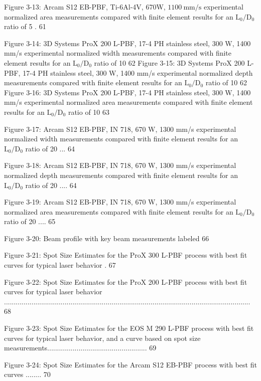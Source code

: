 \documentclass[10pt]{article}
\begin{document}
Figure 3-13: Arcam S12 EB-PBF, Ti-6Al-4V, 670W, $1100 \mathrm{~mm} / \mathrm{s}$ experimental normalized area measurements compared with finite element results for an $\mathrm{L}_{0} / \mathrm{D}_{0}$ ratio of 5 . 61

Figure 3-14: 3D Systems ProX 200 L-PBF, 17-4 PH stainless steel, 300 W, 1400 mm/s experimental normalized width measurements compared with finite element results for an $\mathrm{L}_{0} / \mathrm{D}_{0}$ ratio of 10 62 Figure 3-15: 3D Systems ProX 200 L-PBF, 17-4 PH stainless steel, 300 W, 1400 mm/s experimental normalized depth measurements compared with finite element results for an $\mathrm{L}_{0} / \mathrm{D}_{0}$ ratio of 10 62 Figure 3-16: 3D Systems ProX 200 L-PBF, 17-4 PH stainless steel, 300 W, 1400 mm/s experimental normalized area measurements compared with finite element results for an $\mathrm{L}_{0} / \mathrm{D}_{0}$ ratio of 10 63

Figure 3-17: Arcam S12 EB-PBF, IN 718, 670 W, 1300 mm/s experimental normalized width measurements compared with finite element results for an $\mathrm{L}_{0} / \mathrm{D}_{0}$ ratio of 20 ... 64

Figure 3-18: Arcam S12 EB-PBF, IN 718, 670 W, 1300 mm/s experimental normalized depth measurements compared with finite element results for an $\mathrm{L}_{0} / \mathrm{D}_{0}$ ratio of 20 .... 64

Figure 3-19: Arcam S12 EB-PBF, IN 718, 670 W, 1300 mm/s experimental normalized area measurements compared with finite element results for an $\mathrm{L}_{0} / \mathrm{D}_{0}$ ratio of 20 .... 65

Figure 3-20: Beam profile with key beam measurements labeled 66

Figure 3-21: Spot Size Estimates for the ProX 300 L-PBF process with best fit curves for typical laser behavior . 67

Figure 3-22: Spot Size Estimates for the ProX 200 L-PBF process with best fit curves for typical laser behavior .............................................................................................................................. 68

Figure 3-23: Spot Size Estimates for the EOS M 290 L-PBF process with best fit curves for typical laser behavior, and a curve based on spot size measurements................................................... 69

Figure 3-24: Spot Size Estimates for the Arcam S12 EB-PBF process with best fit curves ........ 70
\end{document}
